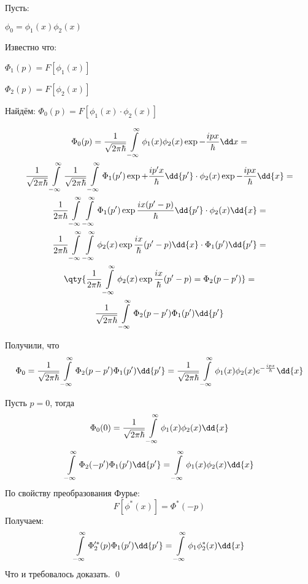 \begin{flushleft}
	
Пусть:

$\phi_0=\phi_1(x)\phi_2(x)$

Известно что:

$\Phi_1(p)=F[\phi_1(x)]$

$\Phi_2(p)=F[\phi_2(x)]$

Найдём:
$\Phi_0(p)=F[\phi_1(x)\cdot\phi_2(x)]$

\end{flushleft}
\begin{gather*}
\Phi_0(p)=\frac{1}{\sqrt{2 \pi \hbar}} 
\infint \phi_1(x)\phi_2(x)\exp{-\frac{ipx}{\hbar}} \dd x =\\
\frac{1}{\sqrt{2 \pi \hbar}}
\infint \frac{1}{\sqrt{2 \pi \hbar}} 
\infint \Phi_1(p')\exp{+\frac{ip' x}{\hbar}}\dd{p'}\cdot \phi_2(x)\exp{-\frac{ipx}{\hbar}}\dd{x}=\\
\frac{1}{2\pi\hbar}
\infint \infint \Phi_1(p')
\exp{\frac{ix(p'-p)}{\hbar}}\dd{p'}
 \cdot\phi_2(x)\dd{x}=\\
\frac{1}{2\pi\hbar}
\infint\infint\phi_2(x)\exp{\frac{ix}{\hbar}(p'-p)}\dd{x}\cdot\Phi_1(p' )\dd{p'}=\\
\qty{\frac{1}{2\pi\hbar}\infint\phi_2(x)\exp{\frac{ix}{\hbar}(p'-p)}=\Phi_2(p-p')}=\\
\frac{1}{\sqrt{2\pi\hbar}}\infint \Phi_2(p-p')\Phi_1(p')\dd{p'}
\end{gather*}

Получили, что 
$$\Phi_0=\frac{1}{\sqrt{2\pi\hbar}}\infint \Phi_2(p-p')\Phi_1(p')\dd{p'}=
\frac{1}{\sqrt{2\pi\hbar}} \infint \phi_1(x)\phi_2(x) e^{-\frac{ipx}{\hbar}} \dd{x}$$

Пусть $p=0$, тогда 
$$\Phi_0(0)=\frac{1}{\sqrt{2\pi\hbar}} \infint \phi_1(x)\phi_2(x)\dd{x}$$
$$\infint \Phi_2(-p' )\Phi_1(p' )\dd{p'}= \infint \phi_1(x) \phi_2(x)\dd{x} $$
По свойству преобразования Фурье:
$$F[\phi^*(x)]=\Phi^*(-p) $$
Получаем:
$$\infint \Phi_2'^*(p)\Phi_1(p') \dd{p'} = \infint \phi_1 \phi^*_2(x) \dd{x} $$
Что и требовалось доказать. \qed